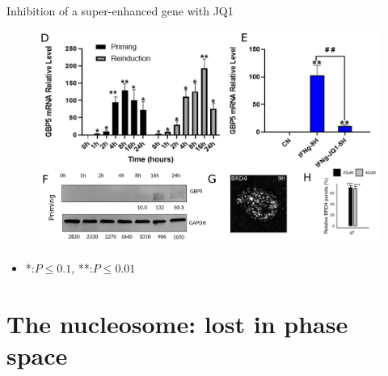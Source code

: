 \documentclass{beamer}					%
\begin{document}

\begin{frame}{Inhibition of a super-enhanced gene with JQ1}
\begin{figure}
\includegraphics[width=12cm]{GBP5-2.png}
\end{figure}
\begin{itemize}
\item *:$P \leq 0.1$, **:$P \leq 0.01$
\end{itemize}
\end{frame}

\section{The nucleosome: lost in phase space}
\end{document}
